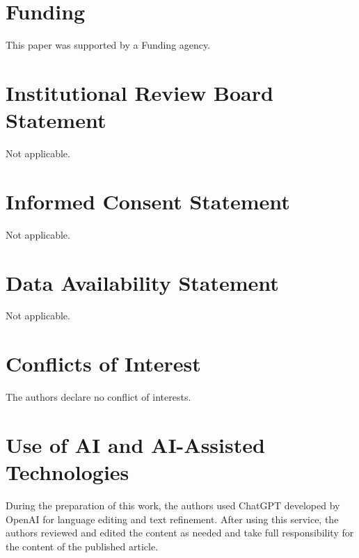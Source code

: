 \documentclass[10pt]{ijgtp}
\begin{document}
\section*{Funding}
This paper was supported by a Funding agency.

\section*{Institutional Review Board Statement}
Not applicable.

\section*{Informed Consent Statement}
Not applicable.

\section*{Data Availability Statement}
Not applicable.

\section*{Conflicts of Interest}
The authors declare no conflict of interests.

\section*{Use of AI and AI-Assisted Technologies}
During the preparation of this work, the authors used ChatGPT developed by OpenAI for language editing and text refinement. After using this service, the authors reviewed and edited the content as needed and take full responsibility for the content of the published article.


\end{document}
